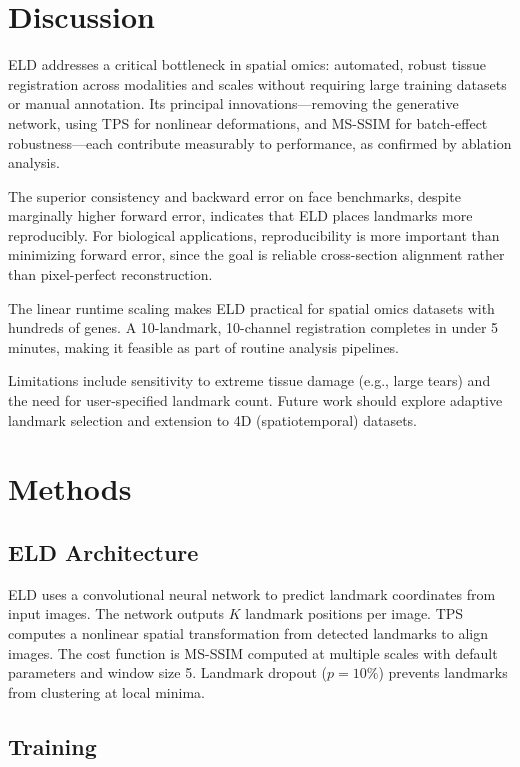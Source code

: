\documentclass[11pt]{article}
\begin{document}
\section{Discussion}

ELD addresses a critical bottleneck in spatial omics: automated, robust tissue registration across modalities and scales without requiring large training datasets or manual annotation. Its principal innovations---removing the generative network, using TPS for nonlinear deformations, and MS-SSIM for batch-effect robustness---each contribute measurably to performance, as confirmed by ablation analysis.

The superior consistency and backward error on face benchmarks, despite marginally higher forward error, indicates that ELD places landmarks more reproducibly. For biological applications, reproducibility is more important than minimizing forward error, since the goal is reliable cross-section alignment rather than pixel-perfect reconstruction.

The linear runtime scaling makes ELD practical for spatial omics datasets with hundreds of genes. A 10-landmark, 10-channel registration completes in under 5 minutes, making it feasible as part of routine analysis pipelines.

Limitations include sensitivity to extreme tissue damage (e.g., large tears) and the need for user-specified landmark count. Future work should explore adaptive landmark selection and extension to 4D (spatiotemporal) datasets.

\section{Methods}

\subsection{ELD Architecture}

ELD uses a convolutional neural network to predict landmark coordinates from input images. The network outputs $K$ landmark positions per image. TPS \citep{bookstein1989principal} computes a nonlinear spatial transformation from detected landmarks to align images. The cost function is MS-SSIM \citep{wang2019ssim} computed at multiple scales with default parameters and window size 5. Landmark dropout ($p = 10\%$) prevents landmarks from clustering at local minima.

\subsection{Training}
\end{document}
